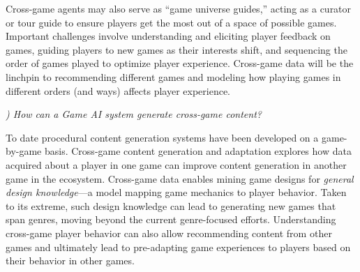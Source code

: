 \documentclass[conference]{IEEEtran}
\newcounter{questionno}
\newcommand{\subsubsectionx}[1]{{\em {\arabic{questionno}) #1}}
	\addtocounter{questionno}{1}
	}
\begin{document}
%
%


Cross-game agents may also serve as ``game universe guides,'' acting as a curator or tour guide to ensure players get the most out of a space of possible games.
Important challenges 
involve understanding and eliciting player feedback on games, guiding players to new games as their interests shift, and sequencing the order of games played to optimize player experience.
Cross-game data will be the linchpin to recommending different games and modeling how playing games in different orders (and ways) affects player experience.

\subsubsectionx{How can a Game AI system generate cross-game content?}
%
To date procedural content generation systems have been developed on a game-by-game basis.
Cross-game content generation and adaptation explores how data acquired about a player in one game can improve content generation in another game in the ecosystem.
Cross-game data enables mining game designs for {\em general design knowledge}---a model mapping game mechanics to player behavior. 
Taken to its extreme, such design knowledge can lead to generating new games that span genres, moving beyond the current genre-focused efforts.
Understanding cross-game player behavior can also allow recommending content from other games and ultimately lead to pre-adapting game experiences to players based on their behavior in other games. 
\end{document}
